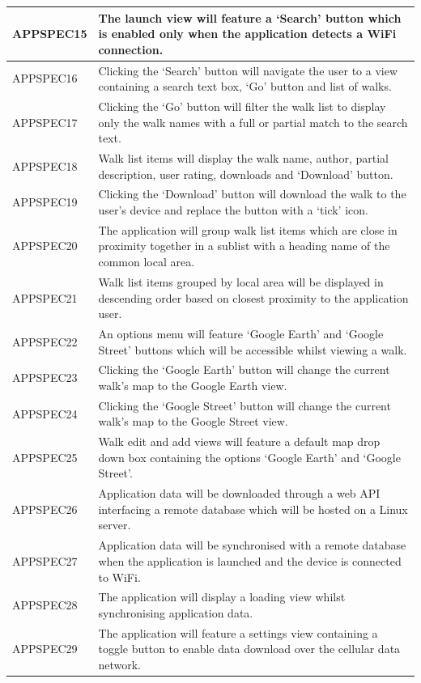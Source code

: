 \documentclass[11pt,a4paper]{article}
\begin{document}
\begin{longtable}{|p{2.5cm}p{13cm}|}
APPSPEC15 & The launch view will feature a `Search' button which is enabled only when the application detects a WiFi connection. \\ \hline
APPSPEC16 & Clicking the `Search' button will navigate the user to a view containing a search text box, `Go' button and list of walks. \\ \hline
APPSPEC17 & Clicking the `Go' button will filter the walk list to display only the walk names with a full or partial match to the search text. \\ \hline
APPSPEC18 & Walk list items will display the walk name, author, partial description, user rating, downloads and `Download' button. \\ \hline
APPSPEC19 & Clicking the `Download' button will download the walk to the user's device and replace the button with a `tick' icon. \\ \hline
APPSPEC20 & The application will group walk list items which are close in proximity together in a sublist with a heading name of the common local area. \\ \hline
APPSPEC21 & Walk list items grouped by local area will be displayed in descending order based on closest proximity to the application user. \\ \hline
APPSPEC22 & An options menu will feature `Google Earth' and `Google Street' buttons which will be accessible whilst viewing a walk. \\ \hline
APPSPEC23 & Clicking the `Google Earth' button will change the current walk's map to the Google Earth view. \\ \hline
APPSPEC24 & Clicking the `Google Street' button will change the current walk's map to the Google Street view. \\ \hline
APPSPEC25 & Walk edit and add views will feature a default map drop down box containing the options `Google Earth' and `Google Street'. \\ \hline
APPSPEC26 & Application data will be downloaded through a web API interfacing a remote database which will be hosted on a Linux server.  \\ \hline
APPSPEC27 & Application data will be synchronised with a remote database when the application is launched and the device is connected to WiFi. \\ \hline
APPSPEC28 & The application will display a loading view whilst synchronising application data. \\ \hline
APPSPEC29 & The application will feature a settings view containing a toggle button to enable data download over the cellular data network. \\ \hline

\end{longtable}
\end{document}
